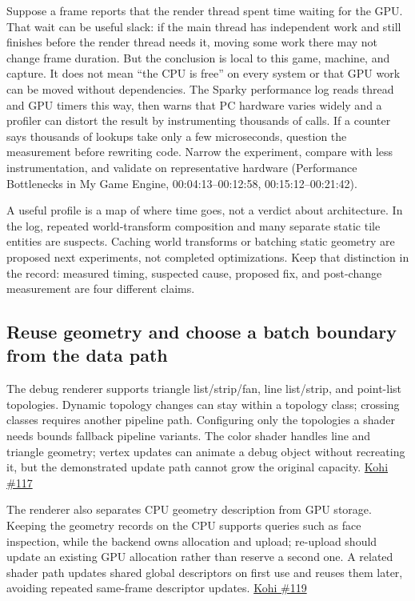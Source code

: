 Suppose a frame reports that the render thread spent time waiting for the GPU. That wait can be useful slack: if the main thread has independent work and still finishes before the render thread needs it, moving some work there may not change frame duration. But the conclusion is local to this game, machine, and capture. It does not mean ``the CPU is free'' on every system or that GPU work can be moved without dependencies. The Sparky performance log reads thread and GPU timers this way, then warns that PC hardware varies widely and a profiler can distort the result by instrumenting thousands of calls. If a counter says thousands of lookups take only a few microseconds, question the measurement before rewriting code. Narrow the experiment, compare with less instrumentation, and validate on representative hardware (Performance Bottlenecks in My Game Engine, 00:04:13--00:12:58, 00:15:12--00:21:42).

A useful profile is a map of where time goes, not a verdict about architecture. In the log, repeated world-transform composition and many separate static tile entities are suspects. Caching world transforms or batching static geometry are proposed next experiments, not completed optimizations. Keep that distinction in the record: measured timing, suspected cause, proposed fix, and post-change measurement are four different claims.

\subsection{Reuse geometry and choose a batch boundary from the data path}\label{06-engine-ii-ch026-reuse-geometry-and-choose-a-batch-boundary-from-the-data-path}

\hypertarget{06-engine-ii-ch026-reuse-geometry-and-choose-a-batch-boundary-from-the-data-path}{}

The debug renderer supports triangle list/strip/fan, line list/strip, and point-list topologies. Dynamic topology changes can stay within a topology class; crossing classes requires another pipeline path. Configuring only the topologies a shader needs bounds fallback pipeline variants. The color shader handles line and triangle geometry; vertex updates can animate a debug object without recreating it, but the demonstrated update path cannot grow the original capacity. \href{https://www.youtube.com/watch?v=FYpNGvexM0g}{Kohi \#117}

The renderer also separates CPU geometry description from GPU storage. Keeping the geometry records on the CPU supports queries such as face inspection, while the backend owns allocation and upload; re-upload should update an existing GPU allocation rather than reserve a second one. A related shader path updates shared global descriptors on first use and reuses them later, avoiding repeated same-frame descriptor updates. \href{https://www.youtube.com/watch?v=pPWshwZB7eo}{Kohi \#119}

